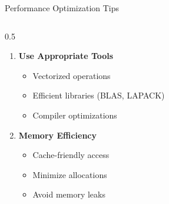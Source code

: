 \documentclass[aspectratio=169,xcolor={dvipsnames}]{beamer}
\begin{document}
\begin{frame}{Performance Optimization Tips}
\begin{columns}[T]
\begin{column}{0.5\textwidth}
\begin{enumerate}
                \item \textbf{Use Appropriate Tools}
                \begin{itemize}
                    \item Vectorized operations
                    \item Efficient libraries (BLAS, LAPACK)
                    \item Compiler optimizations
                \end{itemize}

                \item \textbf{Memory Efficiency}
                \begin{itemize}
                    \item Cache-friendly access
                    \item Minimize allocations
                    \item Avoid memory leaks
                \end{itemize}
            \end{enumerate}
        \end{column}
    \end{columns}
\end{frame}
\end{document}
